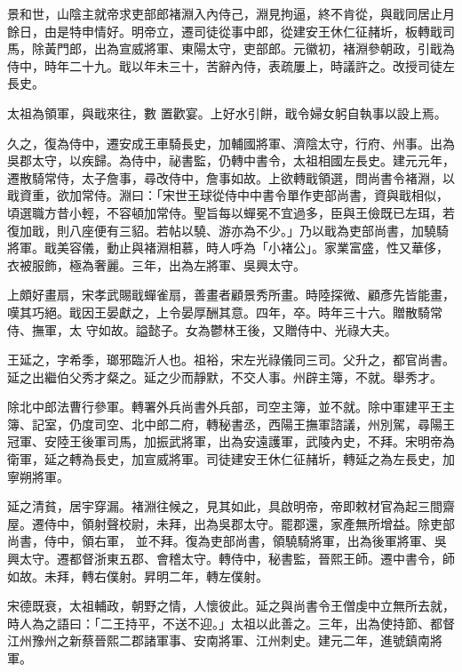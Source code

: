 \begin{pinyinscope}
 景和世，山陰主就帝求吏部郎褚淵入內侍己，淵見拘逼，終不肯從，與戢同居止月餘日，由是特申情好。明帝立，遷司徒從事中郎，從建安王休仁征赭圻，板轉戢司馬，除黃門郎，出為宣威將軍、東陽太守，吏部郎。元徽初，褚淵參朝政，引戢為侍中，時年二十九。戢以年未三十，苦辭內侍，表疏屢上，時議許之。改授司徒左長史。



 太祖為領軍，與戢來往，數
 置歡宴。上好水引餅，戢令婦女躬自執事以設上焉。



 久之，復為侍中，遷安成王車騎長史，加輔國將軍、濟陰太守，行府、州事。出為吳郡太守，以疾歸。為侍中，祕書監，仍轉中書令，太祖相國左長史。建元元年，遷散騎常侍，太子詹事，尋改侍中，詹事如故。上欲轉戢領選，問尚書令褚淵，以戢資重，欲加常侍。淵曰：「宋世王球從侍中中書令單作吏部尚書，資與戢相似，頃選職方昔小輕，不容頓加常侍。聖旨每以蟬冕不宜過多，臣與王儉既已左珥，若復加戢，則八座便有三貂。若帖以驍、游亦為不少。」乃以戢為吏部尚書，加驍騎將軍。戢美容儀，動止與褚淵相慕，時人呼為「小褚公」。家業富盛，性又華侈，衣被服飾，極為奢麗。三年，出為左將軍、吳興太守。



 上頗好畫扇，宋孝武賜戢蟬雀扇，善畫者顧景秀所畫。時陸探微、顧彥先皆能畫，嘆其巧絕。戢因王晏獻之，上令晏厚酬其意。四年，卒。時年三十六。贈散騎常侍、撫軍，太
 守如故。謚懿子。女為鬱林王後，又贈侍中、光祿大夫。



 王延之，字希季，瑯邪臨沂人也。祖裕，宋左光祿儀同三司。父升之，都官尚書。延之出繼伯父秀才粲之。延之少而靜默，不交人事。州辟主簿，不就。舉秀才。



 除北中郎法曹行參軍。轉署外兵尚書外兵部，司空主簿，並不就。除中軍建平王主簿、記室，仍度司空、北中郎二府，轉秘書丞，西陽王撫軍諮議，州別駕，尋陽王冠軍、安陸王後軍司馬，加振武將軍，出為安遠護軍，武陵內史，不拜。宋明帝為衛軍，延之轉為長史，加宣威將軍。司徒建安王休仁征赭圻，轉延之為左長史，加寧朔將軍。



 延之清貧，居宇穿漏。褚淵往候之，見其如此，具啟明帝，帝即敕材官為起三間齋屋。遷侍中，領射聲校尉，未拜，出為吳郡太守。罷郡還，家產無所增益。除吏部尚書，侍中，領右軍，
 並不拜。復為吏部尚書，領驍騎將軍，出為後軍將軍、吳興太守。遷都督浙東五郡、會稽太守。轉侍中，秘書監，晉熙王師。遷中書令，師如故。未拜，轉右僕射。昇明二年，轉左僕射。



 宋德既衰，太祖輔政，朝野之情，人懷彼此。延之與尚書令王僧虔中立無所去就，時人為之語曰：「二王持平，不送不迎。」太祖以此善之。三年，出為使持節、都督江州豫州之新蔡晉熙二郡諸軍事、安南將軍、江州刺史。建元二年，進號鎮南將軍。




\end{pinyinscope}
